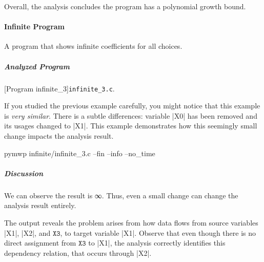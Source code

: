 Overall, the analysis concludes the program has a polynomial growth bound.

\paragraph{Infinite Program}\label{inf-prog}
A program that shows infinite coefficients for all choices.

\subparagraph*{Analyzed Program}

\begin{center}
\begin{minipage}{\textwidth}
\captionsetup{type=lstlisting}
[Program infinite\_3]{\texttt{infinite\_3.c}.}
\label{lst:inifnite3}
\end{minipage}
\end{center}

If you studied the previous example carefully, you might notice that this
example is \emph{very similar}. There is a subtle differences: variable \pr|X0|
has been removed and its usages changed to \pr|X1|. This example demonstrates
how this seemingly small change impacts the analysis result.

\begin{center}
\begin{minipage}{\textwidth}
\begin{cmdlisting}[label={lst:ex4-run-cmd}]
pymwp infinite/infinite_3.c --fin --info --no_time
\end{cmdlisting}
\end{minipage}
\end{center}

\begin{center}
\begin{minipage}{\textwidth}
\end{minipage}
\label{lst:ex4-output}
\end{center}

\subparagraph*{Discussion}

We can observe the result is ∞. Thus, even a small change can
change the analysis result entirely.

The output reveals the problem arises from how data flows from source variables
\pr|X1|, \pr|X2|, and \(\texttt{X3}\), to target variable \pr|X1|. Observe that
even though there is no direct assignment from \(\texttt{X3}\) to \pr|X1|, the
analysis correctly identifies this dependency relation, that occurs through
\pr|X2|.

